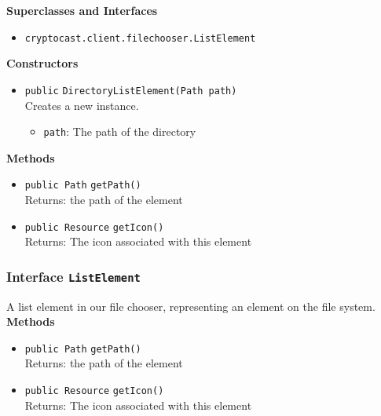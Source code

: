 \textbf{Superclasses and Interfaces}
\begin{itemize}
\item \lstinline|cryptocast.client.filechooser.ListElement|
\end{itemize}



\textbf{Constructors}
\begin{itemize}
\item \lstinline|public| \lstinline|DirectoryListElement|\lstinline|(Path path)|\\
Creates a new instance.
\begin{itemize}
\item \lstinline|path|: The path of the directory
\end{itemize}



\end{itemize}


\textbf{Methods}
\begin{itemize}
\item \lstinline|public Path| \lstinline|getPath|\lstinline|()|\\
Returns: the path of the element



\item \lstinline|public Resource| \lstinline|getIcon|\lstinline|()|\\
Returns: The icon associated with this element



\end{itemize}

\subsubsection{Interface \lstinline|ListElement|}
A list element in our file chooser, representing an element on the file system. \\





\textbf{Methods}
\begin{itemize}
\item \lstinline|public Path| \lstinline|getPath|\lstinline|()|\\
Returns: the path of the element



\item \lstinline|public Resource| \lstinline|getIcon|\lstinline|()|\\
Returns: The icon associated with this element



\end{itemize}


